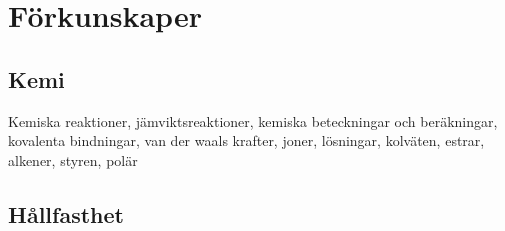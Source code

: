 \section{Förkunskaper}
\subsection{Kemi}
Kemiska reaktioner, jämviktsreaktioner, kemiska beteckningar och beräkningar, kovalenta bindningar, van der waals krafter, joner, lösningar, kolväten, estrar, alkener, styren, polär
\subsection{Hållfasthet}